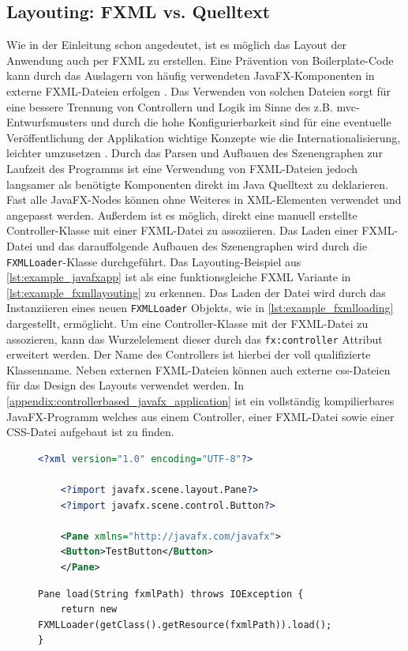 \subsection{Layouting: FXML vs. Quelltext}
Wie in der Einleitung schon angedeutet, ist es möglich das Layout der Anwendung auch per FXML zu erstellen. Eine Prävention von Boilerplate-Code kann durch das Auslagern von häufig verwendeten JavaFX-Komponenten in externe FXML-Dateien erfolgen \cite{Kruk2018}. Das Verwenden von solchen Dateien sorgt für eine bessere Trennung von Controllern und Logik im Sinne des z.B. \ac{mvc}-Entwurfsmusters \cite{Juneau2013} und durch die hohe Konfigurierbarkeit sind für eine eventuelle Veröffentlichung der Applikation wichtige Konzepte wie die Internationalisierung, leichter umzusetzen \cite{Steyer2014}. Durch das Parsen und Aufbauen des Szenengraphen zur Laufzeit des Programms ist eine Verwendung von FXML-Dateien jedoch langsamer als benötigte Komponenten direkt im Java Quelltext zu deklarieren. Fast alle JavaFX-Nodes können ohne Weiteres in XML-Elementen verwendet und angepasst werden. Außerdem ist es möglich, direkt eine manuell erstellte Controller-Klasse mit einer FXML-Datei zu assoziieren. Das Laden einer FXML-Datei und das darauffolgende Aufbauen des Szenengraphen wird durch die \texttt{FXMLLoader}-Klasse durchgeführt. Das Layouting-Beispiel aus \autoref{lst:example_javafxapp} ist als eine funktionsgleiche FXML Variante in \autoref{lst:example_fxmllayouting} zu erkennen. Das Laden der Datei wird durch das Instanziieren eines neuen \texttt{FXMLLoader} Objekts, wie in \autoref{lst:example_fxmlloading} dargestellt, ermöglicht.
\noindent Um eine Controller-Klasse mit der FXML-Datei zu assozieren, kann das Wurzelelement dieser durch das \texttt{fx:controller} Attribut erweitert werden. Der Name des Controllers ist hierbei der voll qualifizierte Klassenname. Neben externen FXML-Dateien können auch externe \ac{css}-Dateien für das Design des Layouts verwendet werden. In \autoref{appendix:controllerbased_javafx_application} ist ein vollständig kompilierbares JavaFX-Programm welches aus einem Controller, einer FXML-Datei sowie einer CSS-Datei aufgebaut ist zu finden.

\begin{figure}[H]
	\begin{lstlisting}[caption={Beispiel -- FXML Layouting.}, captionpos=b, label=lst:example_fxmllayouting, language=XML]
	<?xml version="1.0" encoding="UTF-8"?>
	
	<?import javafx.scene.layout.Pane?>
	<?import javafx.scene.control.Button?>
	
	<Pane xmlns="http://javafx.com/javafx">
	<Button>TestButton</Button>
	</Pane>
	\end{lstlisting}
\end{figure}
\begin{figure}[H]
	\begin{lstlisting}[caption={Beispiel -- FXML Ladeprozess.}, captionpos=b, label=lst:example_fxmlloading]
Pane load(String fxmlPath) throws IOException {
	return new FXMLLoader(getClass().getResource(fxmlPath)).load();
}
	\end{lstlisting}
\end{figure}

